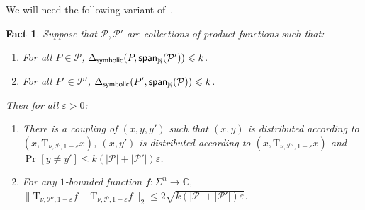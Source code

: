 \documentclass[11pt]{article}
\newtheorem{fact}[thm]{Fact}
\newcommand\card[1]{\left| {#1} \right|}
\newcommand\Prob[2]{{\Pr_{#1}\left[ {#2} \right]}}
\newcommand\norm[1]{\| #1 \|}
\newcommand\spn{{\sf span}_{\mathbb{N}}}
\newcommand\eps{\varepsilon}
\renewcommand\leq{\leqslant}
\begin{document}
        We will need the following variant of~\cite[Fact 4.3]{BKM5}.
\begin{fact}\label{fact:noise_op_basic_prop2}
    Suppose that $\mathcal{P},\mathcal{P}'$ are collections of product functions such that:
    \begin{enumerate}
        \item For all $P\in \mathcal{P}$, $\Delta_{{\sf symbolic}}(P,\spn(\mathcal{P}'))\leq k$.
        \item For all $P'\in \mathcal{P}'$, $\Delta_{{\sf symbolic}}(P',\spn(\mathcal{P}))\leq k$.
    \end{enumerate}
           Then for all $\eps>0$:
        \begin{enumerate}
			\item There is a coupling of $(x, y, y')$ such that $(x,y)$ is distributed according to $(x, \mathrm{T}_{\nu, \mathcal{P}, 1-\eps} x)$,
			$(x,y')$ is distributed according to $(x, \mathrm{T}_{\nu, \mathcal{P}', 1-\eps}x)$ and $\Prob{}{y\neq y'}\leq k(\card{\mathcal{P}}+|\mathcal{P}'|)\eps$.
			\item For any $1$-bounded function $f\colon \Sigma^n\to\mathbb{C}$,
			$\norm{\mathrm{T}_{\nu, \mathcal{P}', 1-\eps} f - \mathrm{T}_{\nu, \mathcal{P}, 1-\eps} f}_2\leq 2\sqrt{k(\card{\mathcal{P}}+|\mathcal{P}'|)\eps}$.
		\end{enumerate}
\end{fact}
\end{document}
